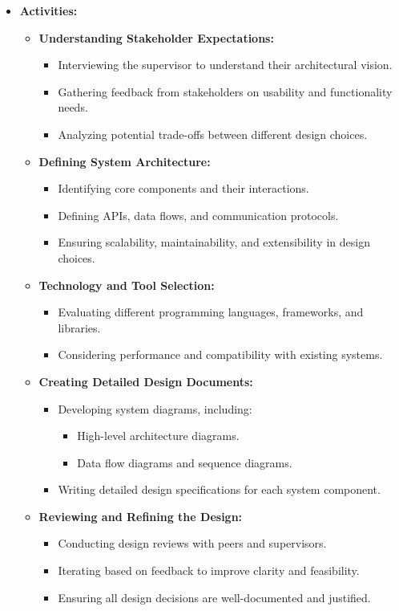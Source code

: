 \documentclass{article}
\begin{document}
\begin{itemize}[leftmargin=*, label={}]
    \item \textbf{Activities:}
    \begin{itemize}
        \item \textbf{Understanding Stakeholder Expectations:}
        \begin{itemize}
            \item Interviewing the supervisor to understand their architectural vision.
            \item Gathering feedback from stakeholders on usability and functionality needs.
            \item Analyzing potential trade-offs between different design choices.
        \end{itemize}
        \item \textbf{Defining System Architecture:}
        \begin{itemize}
            \item Identifying core components and their interactions.
            \item Defining APIs, data flows, and communication protocols.
            \item Ensuring scalability, maintainability, and extensibility in design choices.
        \end{itemize}
        \item \textbf{Technology and Tool Selection:}
        \begin{itemize}
            \item Evaluating different programming languages, frameworks, and libraries.
            \item Considering performance and compatibility with existing systems.
        \end{itemize}
        \item \textbf{Creating Detailed Design Documents:}
        \begin{itemize}
            \item Developing system diagrams, including:
            \begin{itemize}
                \item High-level architecture diagrams.
                \item Data flow diagrams and sequence diagrams.
            \end{itemize}
            \item Writing detailed design specifications for each system component.
        \end{itemize}
        \item \textbf{Reviewing and Refining the Design:}
        \begin{itemize}
            \item Conducting design reviews with peers and supervisors.
            \item Iterating based on feedback to improve clarity and feasibility.
            \item Ensuring all design decisions are well-documented and justified.
        \end{itemize}
    \end{itemize}


\end{itemize}
\end{document}
